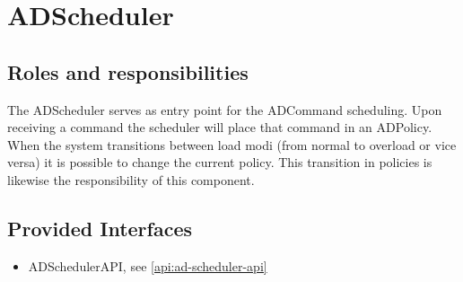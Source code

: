 \section{ADScheduler}
\label{element:ad-scheduler}

\subsection{Roles and responsibilities}

\npar The ADScheduler serves as entry point for the ADCommand scheduling. Upon
receiving a command the scheduler will place that command in an
ADPolicy. When the system transitions between load modi (from normal
to overload or vice versa) it is possible to change the current policy.
This transition in policies is likewise the responsibility of this component.

\subsection{Provided Interfaces}

\begin{itemize}
    \item ADSchedulerAPI, see \ref{api:ad-scheduler-api}
\end{itemize}